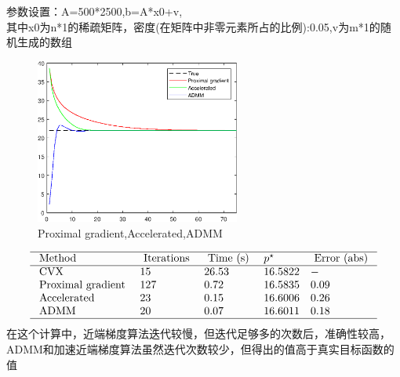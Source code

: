 \documentclass[10pt,aspectratio=43,mathserif,dvipsnames,svgnames,x11names]{beamer}
\begin{document}
	\begin{frame}
		参数设置：A=500*2500,b=A*x0+v,\\ 其中x0为n*1的稀疏矩阵，密度(在矩阵中非零元素所占的比例):0.05,v为m*1的随机生成的数组
		\begin{figure}[H]
			\centering
			\includegraphics[width=0.6\textwidth]{lasso_comp.eps}
			\caption{Proximal gradient,Accelerated,ADMM}
		\end{figure}
	\end{frame}
	\begin{frame}
		$$\begin{array}{llllll}
		\hline \text { Method } & \text { Iterations } & \text { Time (s) } & p^{\star} & \text { Error (abs) } \\
		\hline \text { CVX } & 15 & 26.53 & 16.5822 & -  \\
		\text { Proximal gradient } & 127 & 0.72 & 16.5835 & 0.09  \\
		\text { Accelerated } & 23 & 0.15 & 16.6006 & 0.26  \\
		\text { ADMM } & 20 & 0.07 & 16.6011 & 0.18 \\
		\hline
		\end{array}$$
			在这个计算中，近端梯度算法迭代较慢，但迭代足够多的次数后，准确性较高，ADMM和加速近端梯度算法虽然迭代次数较少，但得出的值高于真实目标函数的值
	\end{frame}
	
\end{document}
